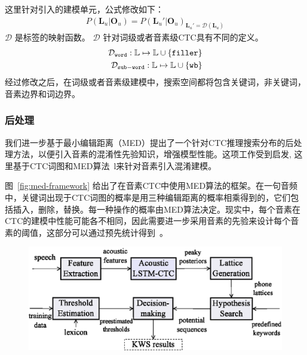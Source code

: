 这里针对引入的建模单元，公式修改如下：
\begin{equation}
\label{equ:ctc-kw}
\begin{split}
P(\mathbf{L}_u|\mathbf{O}_u)=P(\mathbf{L}_u'|\mathbf{O}_u)_{\mathbf{L}_u' = \mathcal{D}(\mathbf{L}_u)}
\end{split}
\end{equation}
$\mathcal{D}$ 是标签的映射函数。 $\mathcal{D}$ 针对词级或者音素级CTC具有不同的定义。
\begin{equation}
\label{equ:ctc-d}
\begin{split}
\mathcal{D}_{\tt{word}}:\mathbb{L}  \mapsto \mathbb{L}  \cup \{{\tt filler}\}\\
\mathcal{D}_{\tt{sub-word}}:\mathbb{L}  \mapsto \mathbb{L}  \cup \{{\tt wb}\}
\end{split}
\end{equation}
经过修改之后，在词级或者音素级建模中，搜索空间都将包含关键词，非关键词，音素边界和词边界。

\subsubsection{后处理}
\label{Sec:post-process-ctc}

我们进一步基于最小编辑距离（MED）提出了一个针对CTC推理搜索分布的后处理方法，以便引入音素的混淆性先验知识，增强模型性能。这项工作受到\cite{chaudhari2007improvements}启发, 这里基于CTC词图和MED算法~\cite{7736093}l来针对音素引入混淆建模。 

图~\ref{fig:med-framework} 给出了在音素CTC中使用MED算法的框架。在一句音频中，关键词出现于CTC词图的概率是用三种编辑距离的概率相乘得到的，它们包括插入，删除，替换。每一种操作的概率由MED算法决定。现实中，每个音素在CTC的建模中性能可能各不相同，因此需要进一步采用音素的先验来设计每个音素的阈值，这部分可以通过预先统计得到~\cite{zhuang-is2016}。

\begin{figure}[!htp]
  \centering
    \captionstyle{\centering}
    \includegraphics[width=\textwidth]{figure/kws-framework.eps}
\end{figure}

